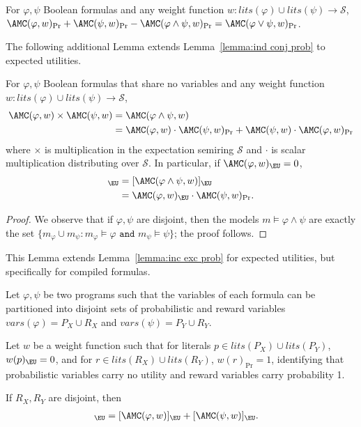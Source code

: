 \begin{lemma}
\label{lemma:inc exc prob}
  For $\varphi, \psi$ Boolean formulas
  and any weight function $w : lits(\varphi) \cup lits(\psi) \to \mathcal S$,
  $\AMC(\varphi,w)_{\Pr}+ \AMC(\psi,w)_{\Pr} -
  \AMC(\varphi \land \psi, w)_{\Pr} = \AMC(\varphi \lor \psi,w)_{\Pr}$.
\end{lemma}

The following additional Lemma extends Lemma~\ref{lemma:ind conj prob}
to expected utilities.

\begin{lemma}
\label{lemma:ind conj eu}
  For $\varphi, \psi$ Boolean formulas that share no variables
  and any weight function $w : lits(\varphi) \cup lits(\psi) \to \mathcal S$,
  \begin{align*}
      \AMC(\varphi,w)\times\AMC(\psi,w) &= \AMC(\varphi \land \psi,w)\\
    &=\AMC(\varphi,w)\cdot\AMC(\psi,w)_{\Pr}+\AMC(\psi,w)\cdot\AMC(\varphi,w)_{\Pr}  
  \end{align*}
  where $\times$ is multiplication in the expectation semiring $\mathcal S$ and $\cdot$
  is scalar multiplication distributing over $\mathcal S$. In particular, if 
  $\AMC(\varphi, w)_{\EU} = 0$,
  \begin{align*}
    [\AMC(\varphi,w)\times\AMC(\psi,w)]_{\EU} &= [\AMC(\varphi \land \psi,w)]_{\EU}\\
    &=\AMC(\varphi,w)_{\EU}\cdot\AMC(\psi,w)_{\Pr}.
  \end{align*}
\end{lemma}

\begin{proof}
  We observe that if $\varphi, \psi$ are disjoint, then 
  the models $m \models \varphi \land \psi$ are exactly the set
  $\{m_{\varphi} \cup m_{\psi}: 
  m_{\varphi} \models \varphi \texttt{ and } m_\psi \models \psi\}$;
  the proof follows.
\end{proof}

This Lemma extends Lemma~\ref{lemma:inc exc prob} for
expected utilities, but specifically for compiled formulas.

\begin{lemma}\label{lemma:inc exc eu}
  Let $\varphi, \psi$ be two programs such that
  the variables of each formula can be partitioned into 
  disjoint sets of probabilistic and reward variables
  $vars(\varphi) = P_X \cup R_X$ and $vars(\psi) = P_Y \cup R_Y$.

  Let $w$ be a weight function such that for literals
  $p \in lits(P_X) \cup lits(P_Y)$, $w(p)_{\EU} = 0$, 
  and for $r \in lits(R_X) \cup lits(R_Y)$,
  $w(r)_{\Pr} = 1$, identifying that probabilistic
  variables carry no utility and reward variables carry
  probability 1. 

  If $R_X, R_Y$
  are disjoint, then
  \begin{align*}
    [\AMC((\varphi \land \conjneg{R_Y} )
    \lor (\psi \land \conjneg{R_X}), w)]_{\EU}
    &= [\AMC(\varphi,w)]_{\EU} + [\AMC(\psi, w)]_{\EU}.
  \end{align*}
\end{lemma}

